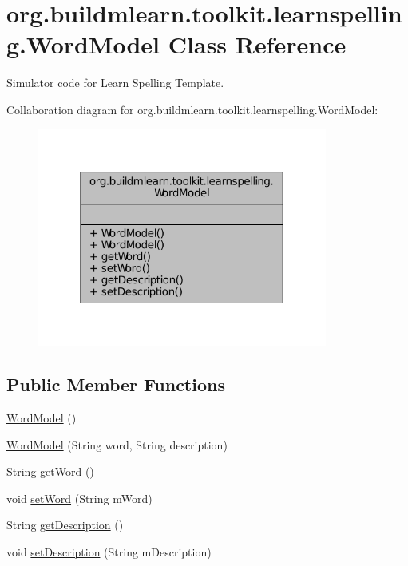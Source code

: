 \hypertarget{classorg_1_1buildmlearn_1_1toolkit_1_1learnspelling_1_1WordModel}{\section{org.\-buildmlearn.\-toolkit.\-learnspelling.\-Word\-Model Class Reference}
\label{classorg_1_1buildmlearn_1_1toolkit_1_1learnspelling_1_1WordModel}
}


Simulator code for Learn Spelling Template.  




Collaboration diagram for org.\-buildmlearn.\-toolkit.\-learnspelling.\-Word\-Model\-:
\nopagebreak
\begin{figure}[H]
\begin{center}
\leavevmode
\includegraphics[width=270pt]{d2/db2/classorg_1_1buildmlearn_1_1toolkit_1_1learnspelling_1_1WordModel__coll__graph}
\end{center}
\end{figure}
\subsection*{Public Member Functions}
\begin{DoxyCompactItemize}
\item 
\hyperlink{classorg_1_1buildmlearn_1_1toolkit_1_1learnspelling_1_1WordModel_af0156ab34f1d126119a4ad5d4eca8f79}{Word\-Model} ()
\item 
\hyperlink{classorg_1_1buildmlearn_1_1toolkit_1_1learnspelling_1_1WordModel_a5bfe3dff9d811edde871b963be440068}{Word\-Model} (String word, String description)
\item 
String \hyperlink{classorg_1_1buildmlearn_1_1toolkit_1_1learnspelling_1_1WordModel_a5513ec140cc9d5def825a6731ddd59d0}{get\-Word} ()
\item 
void \hyperlink{classorg_1_1buildmlearn_1_1toolkit_1_1learnspelling_1_1WordModel_a06649c037308def83fec4680698192f7}{set\-Word} (String m\-Word)
\item 
String \hyperlink{classorg_1_1buildmlearn_1_1toolkit_1_1learnspelling_1_1WordModel_a6414bb30d5793ce808d87d54cdeb54c6}{get\-Description} ()
\item 
void \hyperlink{classorg_1_1buildmlearn_1_1toolkit_1_1learnspelling_1_1WordModel_a2c850add5df8027c95835e54ff1c2a2a}{set\-Description} (String m\-Description)
\end{DoxyCompactItemize}


